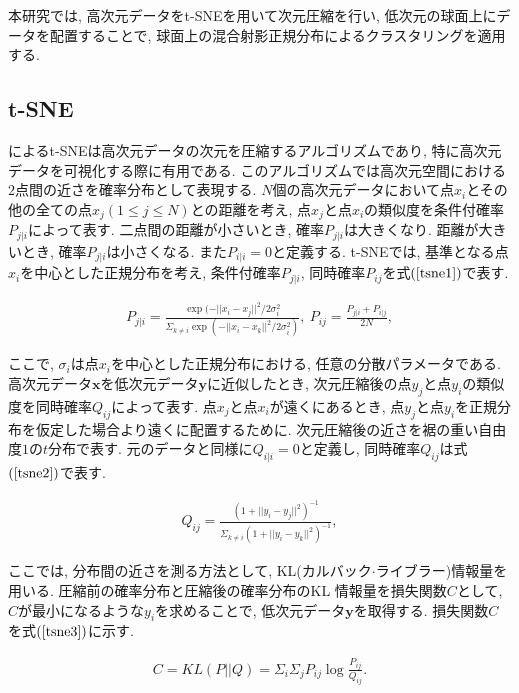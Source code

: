 \documentclass[a4j,12pt]{jarticle}
\begin{document}
本研究では, 高次元データをt-SNEを用いて次元圧縮を行い, 低次元の球面上にデータを配置することで, 球面上の混合射影正規分布によるクラスタリングを適用する. 

\subsection{t-SNE}

\citet{tSNE}によるt-SNEは高次元データの次元を圧縮するアルゴリズムであり, 特に高次元データを可視化する際に有用である. このアルゴリズムでは高次元空間における$2$点間の近さを確率分布として表現する. $N$個の高次元データにおいて点$x_i$とその他の全ての点$x_j (1 \leq j \leq N)$との距離を考え, 点$x_j$と点$x_i$の類似度を条件付確率$P_{j|i}$によって表す. 二点間の距離が小さいとき, 確率$P_{j|i}$は大きくなり. 距離が大きいとき, 確率$P_{j|i}$は小さくなる. また$P_{i|i} = 0$と定義する. t-SNEでは, 基準となる点$x_i$を中心とした正規分布を考え, 条件付確率$P_{j|i}$, 同時確率$P_{ij}$を式$(\ref{tsne1})$で表す.

\begin{eqnarray}
\label{tsne1}
P_{j|i} = \frac{\exp(-||x_i - x_j||^2 / 2\sigma_i^2}{\Sigma_{k \neq i}\exp(-||x_i - x_k||^2/ 2\sigma_i^2)},\ 
P_{ij} = \frac{P_{j|i} + P_{i|j}}{2N},
\end{eqnarray}

\noindent
ここで, $\sigma_i$は点$x_i$を中心とした正規分布における, 任意の分散パラメータである. 高次元データ$\bm x$を低次元データ$\bm y$に近似したとき, 次元圧縮後の点$y_j$と点$y_i$の類似度を同時確率$Q_{ij}$によって表す. 点$x_j$と点$x_i$が遠くにあるとき, 点$y_j$と点$y_i$を正規分布を仮定した場合より遠くに配置するために. 次元圧縮後の近さを裾の重い自由度$1$の$t$分布で表す. 元のデータと同様に$Q_{i|i} = 0$と定義し, 同時確率$Q_{ij}$は式$(\ref{tsne2})$で表す.

\begin{eqnarray}
\label{tsne2}
Q_{ij} = \frac{(1 + ||y_i - y_j||^2)^{-1}}{\Sigma_{k \neq i}(1 + ||y_i - y_k||^2)^{-1}},
\end{eqnarray}

ここでは, 分布間の近さを測る方法として, KL(カルバック$\cdot$ライブラー)情報量を用いる. 圧縮前の確率分布と圧縮後の確率分布のKL
情報量を損失関数$C$として, $C$が最小になるような$y_i$を求めることで, 低次元データ$\bm y$を取得する. 損失関数$C$を式$(\ref{tsne3})$に示す.

\begin{eqnarray}
\label{tsne3}
C = KL(P || Q) = \Sigma_i \Sigma_j P_{ij} \log \frac{P_{ij}}{Q_{ij}}.
\end{eqnarray}
\end{document}
